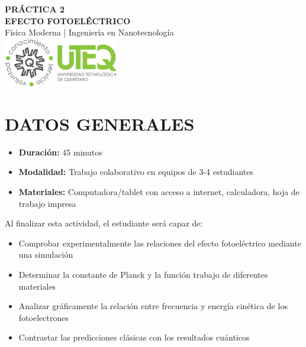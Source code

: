 \documentclass[12pt,a4paper]{article}
\begin{document}
	
	\begin{center}
		{\Huge \textbf{PRÁCTICA 2}}\\[0.3cm]
		{\LARGE \textbf{EFECTO FOTOELÉCTRICO}}\\[0.2cm]
		{\large Física Moderna | Ingeniería en Nanotecnología}\\[1cm]
		\includegraphics[width=5cm]{../../Imagenes/Logo_uteq}
	\end{center}
	
	\vspace{0.5cm}
	
	\section*{DATOS GENERALES}
	
	\begin{itemize}
		\item \textbf{Duración:} 45 minutos
		\item \textbf{Modalidad:} Trabajo colaborativo en equipos de 3-4 estudiantes
		\item \textbf{Materiales:} Computadora/tablet con acceso a internet, calculadora, hoja de trabajo impresa
	\end{itemize}

	\vspace{0.5cm}
	
	\begin{objetivobox}
		Al finalizar esta actividad, el estudiante será capaz de:
		\begin{itemize}
			\item Comprobar experimentalmente las relaciones del efecto fotoeléctrico mediante una simulación
			\item Determinar la constante de Planck y la función trabajo de diferentes materiales
			\item Analizar gráficamente la relación entre frecuencia y energía cinética de los fotoelectrones
			\item Contrastar las predicciones clásicas con los resultados cuánticos
		\end{itemize}
	\end{objetivobox}
	
	\vspace{1cm}
\end{document}
